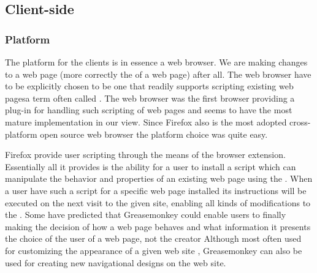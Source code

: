 \subsection{Client-side}

\subsubsection{Platform}
\label{section:selection.stack.client.platform}

The platform for the clients is in essence a web browser. We are making
changes to a web page (more correctly the  of a web page)
after all. The web browser have to be explicitly chosen
to be one that readily supports scripting existing
web pages\dash{}a term often called .
The %
web browser was the first browser providing a
plug-in for handling such scripting of web pages and seems to have the most
mature implementation in our view. Since Firefox also is the
most adopted%
cross-platform open source web browser the platform choice was quite easy.

Firefox provide user scripting through the means of the
%
browser extension. Essentially all it provides is the ability for a user to
install a script which can manipulate the behavior and properties of an
existing web page using the .%
When a user have such a script for a specific web page installed its
instructions will be executed on the next visit to the given site, enabling
all kinds of modifications to the .
Some have predicted that Greasemonkey could enable users to
finally \dash{}making the decision of how a web page
behaves and what information it presents the choice of the user of a web page,
not the creator \citep[p--4.]{filman06}
Although most often used
for customizing the appearance of a given web site \citep[]{vitali06},
Greasemonkey can also be used for creating new navigational designs on the
\urort{} web site.

